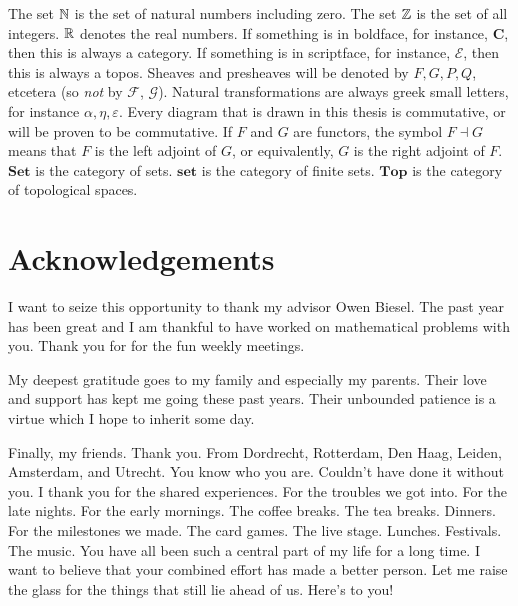 \bigskip

The set $\mathbb{N}$ is the set of natural numbers including zero. 
The set $\mathbb{Z}$ is the set of all integers. $\mathbb{R}$ denotes the real numbers. If something is in boldface, for instance, $\mathbf{C}$, then this is always a category. If something is in scriptface, for instance, $\mathscr{E}$, then this is always a topos. Sheaves and presheaves will be denoted by $F,G,P,Q$, etcetera (so \emph{not} by $\mathcal{F}$, $\mathcal{G}$). Natural transformations are always greek small letters, for instance $\alpha, \eta, \varepsilon$. Every diagram that is drawn in this thesis is commutative, or will be proven to be commutative. If $F$ and $G$ are functors, the symbol $F \dashv G$ means that $F$ is the left adjoint of $G$, or equivalently, $G$ is the right adjoint of $F$. $\mathbf{Set}$ is the category of sets. $\mathbf{set}$ is the category of finite sets. $\mathbf{Top}$ is the category of topological spaces.

\newpage
\section{Acknowledgements}
\bigskip \bigskip

I want to seize this opportunity to thank my advisor Owen Biesel. The past year has been great and I am thankful to have worked on mathematical problems with you. Thank you for for the fun weekly meetings.

\bigskip

\bigskip

My deepest gratitude goes to my family and especially my parents. Their love and support has kept me going these past years. Their unbounded patience is a virtue which I hope to inherit some day.

\bigskip

\bigskip

Finally, my friends. Thank you. From Dordrecht, Rotterdam, Den Haag, Leiden, Amsterdam, and Utrecht. You know who you are. Couldn't have done it without you. I thank you for the shared experiences. For the troubles we got into. For the late nights. For the early mornings. The coffee breaks. The tea breaks. Dinners. For the milestones we made. The card games. The live stage. Lunches. Festivals. The music. You have all been such a central part of my life for a long time. I want to believe that your combined effort has made a better person. Let me raise the glass for the things that still lie ahead of us. Here's to you!

\newpage

